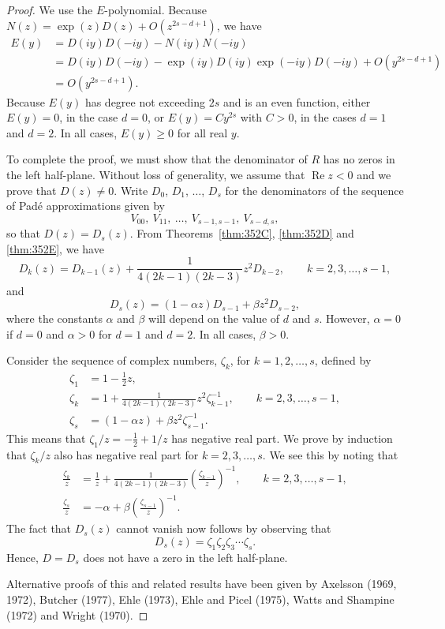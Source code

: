 \begin{proof}
We use the $E$-polynomial. Because $N(z)=\exp(z)D(z)+O(z^{2s-d+1})$,
we have
\begin{align*}
E(y)&=D(iy)D(-iy)-N(iy)N(-iy)\\
    &=D(iy)D(-iy)-\exp(iy)D(iy)\exp(-iy)D(-iy)+O(y^{2s-d+1})\\
    &=O(y^{2s-d+1}).
\end{align*}
Because $E(y)$ has degree not exceeding $2s$ and is an even function, either
$E(y)=0$, in the case $d=0$, or $E(y)=Cy^{2s}$ with $C>0$, in the cases $d=1$
and $d=2$. In all cases, $E(y)\geq 0$ for all real $y$.

To complete the proof, we must show that the denominator of $R$ has no
zeros in the left half-plane. Without loss of generality, we assume that $\operatorname{Re}z<0$
and we prove that $D(z)\neq 0$. Write $D_0$, $D_1$, $\dots$, $D_s$ for the denominators of
the sequence of Pad\'e approximations given by
\[
V_{00},\ V_{11},\ \dots,\ V_{s-1,s-1},\ V_{s-d,s},
\]
so that $D(z)=D_s(z)$. From Theorems~\ref{thm:352C}, \ref{thm:352D} and \ref{thm:352E}, we have
\begin{equation}
D_k(z)=D_{k-1}(z)+\frac{1}{4(2k-1)(2k-3)}z^2D_{k-2},\qquad k=2,3,\dots,s-1, \tag{353a}
\end{equation}
and
\begin{equation}
D_s(z)=(1-\alpha z)D_{s-1}+\beta z^2D_{s-2}, \tag{353b}
\end{equation}
where the constants $\alpha$ and $\beta$ will depend on the value of $d$ and $s$. However,
$\alpha=0$ if $d=0$ and $\alpha>0$ for $d=1$ and $d=2$. In all cases, $\beta>0$.

Consider the sequence of complex numbers, $\zeta_k$, for $k=1,2,\dots,s$, defined
by
\begin{align*}
\zeta_1 &= 1-\frac{1}{2}z,\\
\zeta_k &= 1+\frac{1}{4(2k-1)(2k-3)}z^2\zeta_{k-1}^{-1},\qquad k=2,3,\dots,s-1,\\
\zeta_s &= (1-\alpha z)+\beta z^2\zeta_{s-1}^{-1}.
\end{align*}
This means that $\zeta_1/z=-\frac{1}{2}+1/z$ has negative real part. We prove by
induction that $\zeta_k/z$ also has negative real part for $k=2,3,\dots,s$. We see this
by noting that
\begin{align*}
\frac{\zeta_k}{z}&=\frac{1}{z}+\frac{1}{4(2k-1)(2k-3)}\left(\frac{\zeta_{k-1}}{z}\right)^{-1},\qquad k=2,3,\dots,s-1,\\
\frac{\zeta_s}{z}&=-\alpha+\beta\left(\frac{\zeta_{s-1}}{z}\right)^{-1}.
\end{align*}
The fact that $D_s(z)$ cannot vanish now follows by observing that
\[
D_s(z)=\zeta_1\zeta_2\zeta_3\cdots\zeta_s.
\]
Hence, $D=D_s$ does not have a zero in the left half-plane.

Alternative proofs of this and related results have been given by Axelsson
(1969, 1972), Butcher (1977), Ehle (1973), Ehle and Picel (1975), Watts and
Shampine (1972) and Wright (1970).
\end{proof}

